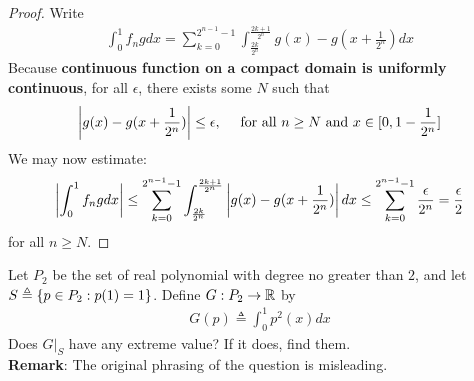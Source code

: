 \documentclass{report}
\begin{document}
\begin{proof}
Write
\begin{align*}
\int_0^1 f_ngdx= \sum_{k=0}^{2^{n-1}-1} \int_{\frac{2k}{2^n}}^{\frac{2k+1}{2^n}} g(x)- g(x+ \frac{1}{2^n}) dx 
\end{align*}
Because  \textbf{continuous function on a compact domain is uniformly continuous}, for all $\epsilon $, there exists some $N$ such that
\begin{align*}
\left|g(x)-g(x+ \frac{1}{2^n})\right| \leq \epsilon ,\quad \text{ for all }n\geq N\text{ and }x \in [0,1-\frac{1}{2^n}]
\end{align*}
We may now estimate: 
\begin{align*}
\left|\int_0^1f_ngdx\right|\leq \sum_{k=0}^{2^{n-1}-1} \int_{\frac{2k}{2^n}}^{\frac{2k+1}{2^n}} \left|g(x)-g(x+\frac{1}{2^n})\right| dx \leq \sum_{k=0}^{2^{n-1}-1} \frac{\epsilon }{2^n}= \frac{\epsilon }{2}
\end{align*}
for all $n\geq N$. 
\end{proof}
\begin{question}{}{}
Let $P_2$ be the set of real polynomial with degree no greater than  $2$, and let $S\triangleq \{ p \in P_2: p(1)=1 \}$. Define $G:P_2\rightarrow \mathbb{R}$ by 
\begin{align*}
G(p)\triangleq \int_0^1 p^2(x)dx
\end{align*}
Does $G|_S$ have any extreme value? If it does, find them.\\ 

\textbf{Remark}: The original phrasing of the question is misleading. 
\end{question}
\end{document}
